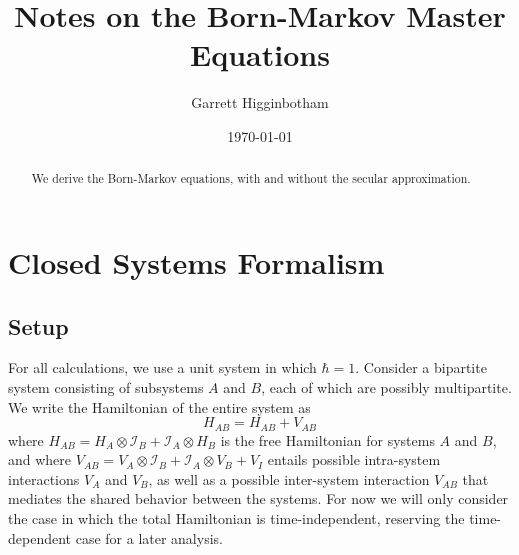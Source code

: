 \documentclass[aps, prl, preprint]{revtex4-1}
\newcommand{\ten}{\otimes}
\newcommand{\I}{\mathcal{I}}
\begin{document}

\title{Notes on the Born-Markov Master Equations}
\author{Garrett Higginbotham}
\date{\today}
\begin{abstract}
We derive the Born-Markov equations, with and without the secular approximation.
\end{abstract}

%

\maketitle

\section{Closed Systems Formalism}

\subsection{Setup}

For all calculations, we use a unit system in which $\hbar = 1$. Consider a bipartite system consisting of subsystems $A$ and $B$, each of which are possibly multipartite. We write the Hamiltonian of the entire system as
\begin{equation}\label{ham}
H_{AB} = H_{AB} + V_{AB}
\end{equation}
where $H_{AB} =  H_A\ten\I_B + \I_A\ten H_B$ is the free Hamiltonian for systems $A$ and $B$, and where $V_{AB} = V_A\ten\I_B + \I_A\ten V_B + V_I$ entails possible intra-system interactions $V_A$ and $V_B$, as well as a possible inter-system interaction $V_{AB}$ that mediates the shared behavior between the systems. For now we will only consider the case in which the total Hamiltonian is time-independent, reserving the time-dependent case for a later analysis.
\end{document}
